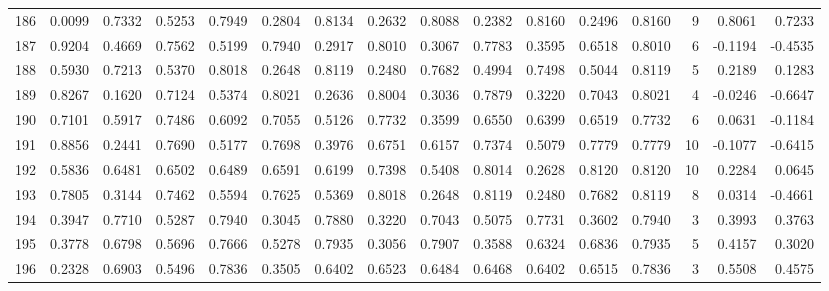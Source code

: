 \begin{tabular}{lrrrrrrrrrrrrrrr}
186 &      0.0099 &  0.7332 &  0.5253 &  0.7949 &  0.2804 &  0.8134 &  0.2632 &  0.8088 &  0.2382 &  0.8160 &   0.2496 &     0.8160 &      9 &                    0.8061 &                     0.7233 \\
187 &      0.9204 &  0.4669 &  0.7562 &  0.5199 &  0.7940 &  0.2917 &  0.8010 &  0.3067 &  0.7783 &  0.3595 &   0.6518 &     0.8010 &      6 &                   -0.1194 &                    -0.4535 \\
188 &      0.5930 &  0.7213 &  0.5370 &  0.8018 &  0.2648 &  0.8119 &  0.2480 &  0.7682 &  0.4994 &  0.7498 &   0.5044 &     0.8119 &      5 &                    0.2189 &                     0.1283 \\
189 &      0.8267 &  0.1620 &  0.7124 &  0.5374 &  0.8021 &  0.2636 &  0.8004 &  0.3036 &  0.7879 &  0.3220 &   0.7043 &     0.8021 &      4 &                   -0.0246 &                    -0.6647 \\
190 &      0.7101 &  0.5917 &  0.7486 &  0.6092 &  0.7055 &  0.5126 &  0.7732 &  0.3599 &  0.6550 &  0.6399 &   0.6519 &     0.7732 &      6 &                    0.0631 &                    -0.1184 \\
191 &      0.8856 &  0.2441 &  0.7690 &  0.5177 &  0.7698 &  0.3976 &  0.6751 &  0.6157 &  0.7374 &  0.5079 &   0.7779 &     0.7779 &     10 &                   -0.1077 &                    -0.6415 \\
192 &      0.5836 &  0.6481 &  0.6502 &  0.6489 &  0.6591 &  0.6199 &  0.7398 &  0.5408 &  0.8014 &  0.2628 &   0.8120 &     0.8120 &     10 &                    0.2284 &                     0.0645 \\
193 &      0.7805 &  0.3144 &  0.7462 &  0.5594 &  0.7625 &  0.5369 &  0.8018 &  0.2648 &  0.8119 &  0.2480 &   0.7682 &     0.8119 &      8 &                    0.0314 &                    -0.4661 \\
194 &      0.3947 &  0.7710 &  0.5287 &  0.7940 &  0.3045 &  0.7880 &  0.3220 &  0.7043 &  0.5075 &  0.7731 &   0.3602 &     0.7940 &      3 &                    0.3993 &                     0.3763 \\
195 &      0.3778 &  0.6798 &  0.5696 &  0.7666 &  0.5278 &  0.7935 &  0.3056 &  0.7907 &  0.3588 &  0.6324 &   0.6836 &     0.7935 &      5 &                    0.4157 &                     0.3020 \\
196 &      0.2328 &  0.6903 &  0.5496 &  0.7836 &  0.3505 &  0.6402 &  0.6523 &  0.6484 &  0.6468 &  0.6402 &   0.6515 &     0.7836 &      3 &                    0.5508 &                     0.4575 \\

\end{tabular}
